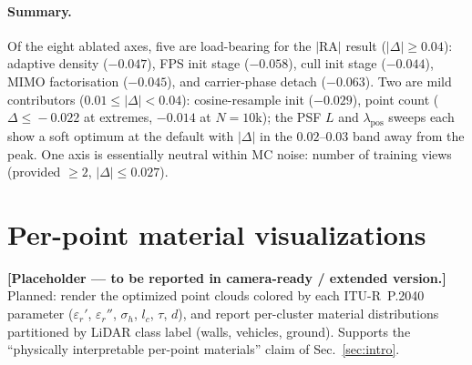\paragraph{Summary.} Of the eight ablated axes, five are load-bearing for the $|\mathrm{RA}|$ result ($|\Delta| \geq 0.04$): adaptive density ($-0.047$), FPS init stage ($-0.058$), cull init stage ($-0.044$), MIMO factorisation ($-0.045$), and carrier-phase detach ($-0.063$). Two are mild contributors ($0.01 \leq |\Delta| < 0.04$): cosine-resample init ($-0.029$), point count ($\Delta\!\leq\!-0.022$ at extremes, $-0.014$ at $N{=}10$k); the PSF $L$ and $\lambda_{\mathrm{pos}}$ sweeps each show a soft optimum at the default with $|\Delta|$ in the $0.02$--$0.03$ band away from the peak. One axis is essentially neutral within MC noise: number of training views (provided $\geq 2$, $|\Delta|\!\leq\!0.027$).

\section{Per-point material visualizations}
\label{app:materials}

\textbf{[Placeholder --- to be reported in camera-ready / extended version.]} Planned: render the optimized point clouds colored by each ITU-R~P.2040 parameter ($\varepsilon_r'$, $\varepsilon_r''$, $\sigma_h$, $l_c$, $\tau$, $d$), and report per-cluster material distributions partitioned by LiDAR class label (walls, vehicles, ground). Supports the ``physically interpretable per-point materials'' claim of Sec.~\ref{sec:intro}.
